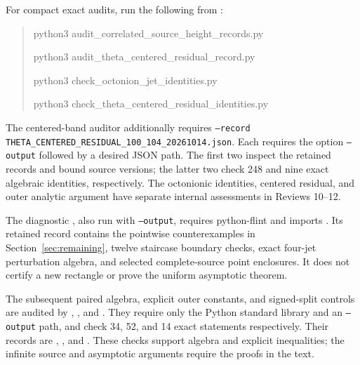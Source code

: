 \documentclass[11pt]{article}
\numberwithin{equation}{section}
\theoremstyle{definition}
\theoremstyle{remark}
\begin{document}
For compact exact audits, run the following from :
\begin{quote}\small\ttfamily
python3 audit\_correlated\_source\_height\_records.py\par
python3 audit\_theta\_centered\_residual\_record.py\par
python3 check\_octonion\_jet\_identities.py\par
python3 check\_theta\_centered\_residual\_identities.py
\end{quote}
The centered-band auditor additionally requires
\texttt{--record THETA\_CENTERED\_RESIDUAL\_100\_104\_20261014.json}.
Each requires the option \texttt{--output} followed by a desired JSON
path. The first two inspect the retained records and bound source
versions; the latter two check 248 and nine exact algebraic identities,
respectively. The octonionic identities, centered residual, and outer
analytic argument have separate internal assessments in Reviews 10--12.

The diagnostic
, also run
with \texttt{--output}, requires python-flint and imports
. Its retained record
contains the pointwise counterexamples in Section~\ref{sec:remaining},
twelve staircase boundary checks, exact four-jet perturbation algebra,
and selected complete-source point enclosures. It does not certify a
new rectangle or prove the uniform asymptotic theorem.

The subsequent paired algebra, explicit outer constants, and signed-split
controls are audited by
,
, and
.
They require only the Python standard library and an \texttt{--output}
path, and check 34, 52, and 14 exact statements respectively. Their
records are
,
, and
.
These checks support algebra and explicit inequalities; the infinite
source and asymptotic arguments require the proofs in the text.
\end{document}
